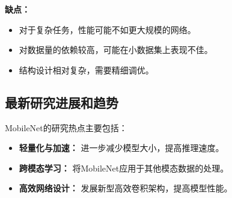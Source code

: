 \textbf{缺点：}
\begin{itemize}
    \item 对于复杂任务，性能可能不如更大规模的网络。
    \item 对数据量的依赖较高，可能在小数据集上表现不佳。
    \item 结构设计相对复杂，需要精细调优。
\end{itemize}

\subsection*{最新研究进展和趋势}
MobileNet的研究热点主要包括：
\begin{itemize}
    \item \textbf{轻量化与加速：} 进一步减少模型大小，提高推理速度。
    \item \textbf{跨模态学习：} 将MobileNet应用于其他模态数据的处理。
    \item \textbf{高效网络设计：} 发展新型高效卷积架构，提高模型性能。
\end{itemize}
